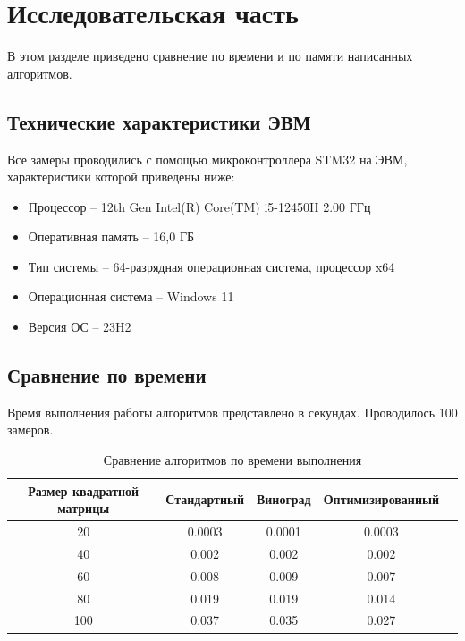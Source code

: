 \documentclass{article}
\begin{document}
\clearpage\section{Исследовательская часть}
В этом разделе приведено сравнение по времени и по памяти написанных алгоритмов.

\subsection{Технические характеристики ЭВМ}
Все замеры проводились с помощью микроконтроллера STM32 на ЭВМ, характеристики которой приведены ниже:
\begin{itemize}
	\item Процессор -- 12th Gen Intel(R) Core(TM) i5-12450H   2.00 ГГц
	\item Оперативная память -- 16,0 ГБ
	\item Тип системы -- 64-разрядная операционная система, процессор x64
	\item Операционная система -- Windows 11
	\item Версия ОС -- 23H2
\end{itemize}

\subsection{Сравнение  по времени}
Время выполнения работы алгоритмов представлено в секундах. Проводилось 100 замеров.

\begin{table}[h]
	\begin{center}
	\caption{\label{tbl:all_time_cmp} Сравнение алгоритмов по времени выполнения}
	\begin{tabular}{|c|c|c|c|c|}
		\hline
		Размер квадратной матрицы & Стандартный & Виноград &  Оптимизированный
		\\ \hline
		20 & 0.0003 & 0.0001 & 0.0003
		\\ \hline
		40 & 0.002 & 0.002 & 0.002
		\\ \hline
		60 & 0.008 & 0.009 & 0.007
		\\ \hline
		80 & 0.019 & 0.019 & 0.014
		\\ \hline
		100 & 0.037 & 0.035 & 0.027
		\\ \hline
	\end{tabular}
	\end{center}
\end{table}
\end{document}
